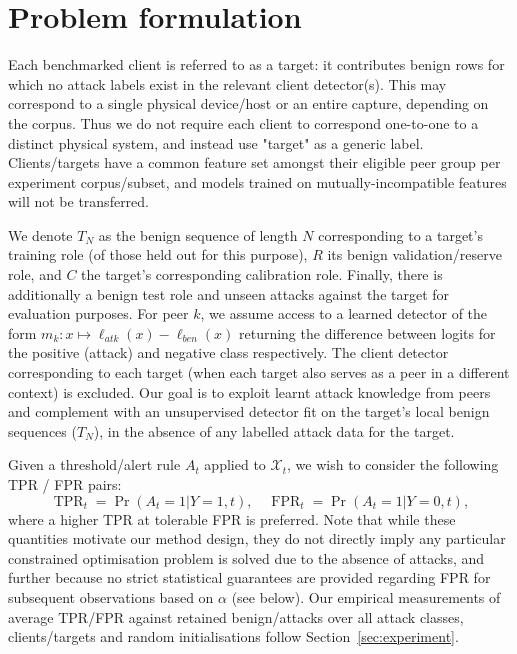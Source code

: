 \section{Problem formulation} 
\label{sec:problem} 
Each benchmarked client is referred to as a target: it contributes benign rows for which no attack labels exist in the relevant client detector(s). This may correspond to a single physical device/host or an entire capture, depending on the corpus. Thus we do not require each client to correspond one-to-one to a distinct physical system, and instead use "target" as a generic label. Clients/targets have a common feature set amongst their eligible peer group per experiment corpus/subset, and models trained on mutually-incompatible features will not be transferred.

We denote $T_N$ as the benign sequence of length $N$ corresponding to a target's training role (of those held out for this purpose), $R$ its benign validation/reserve role, and $C$ the target's corresponding calibration role. Finally, there is additionally a benign test role and unseen attacks against the target for evaluation purposes. For peer $k$, we assume access to a learned detector of the form $m_k: x \mapsto \ell_{atk}(x)-\ell_{ben}(x)$ returning the difference between logits for the positive (attack) and negative class respectively. The client detector corresponding to each target (when each target also serves as a peer in a different context) is excluded. Our goal is to exploit learnt attack knowledge from peers and complement with an unsupervised detector fit on the target's local benign sequences ($T_N$), in the absence of any labelled attack data for the target.

Given a threshold/alert rule $A_t$ applied to $\mathcal{X}_t$, we wish to consider the following TPR / FPR pairs:
\begin{equation} 
\operatorname{TPR}_t=\Pr(A_t = 1 | Y=1, t),\quad 
\operatorname{FPR}_t=\Pr(A_t = 1 | Y=0, t), 
\label{eq:objective} 
\end{equation} 
where a higher TPR at tolerable FPR is preferred. Note that while these quantities motivate our method design, they do not directly imply any particular constrained optimisation problem is solved due to the absence of attacks, and further because no strict statistical guarantees are provided regarding FPR for subsequent observations based on $\alpha$ (see below). Our empirical measurements of average TPR/FPR against retained benign/attacks over all attack classes, clients/targets and random initialisations follow Section~\ref{sec:experiment}.

